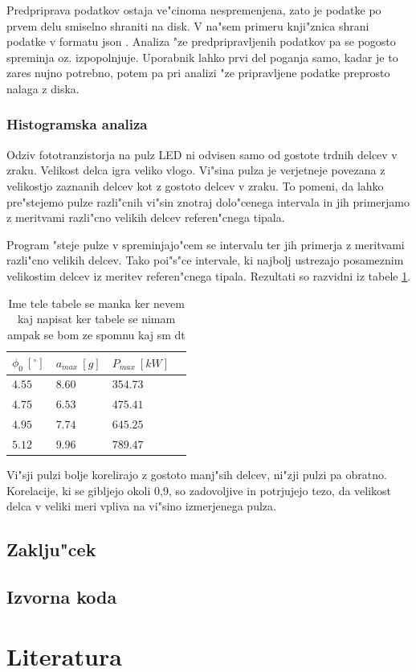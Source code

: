 \documentclass[11pt,a4paper]{article}
\begin{document}
Predpriprava podatkov ostaja ve"cinoma nespremenjena, zato je podatke po prvem delu smiselno shraniti na disk. V na"sem primeru knji"znica shrani podatke v formatu json \cite{json}. Analiza "ze predpripravljenih podatkov pa se pogosto spreminja oz. izpopolnjuje. Uporabnik lahko prvi del poganja samo, kadar je to zares nujno potrebno, potem pa pri analizi "ze pripravljene podatke preprosto nalaga z diska. 

\subsubsection{Histogramska analiza}
Odziv fototranzistorja na pulz LED ni odvisen samo od gostote trdnih delcev v zraku. Velikost delca igra veliko vlogo. Vi"sina pulza je verjetneje povezana z velikostjo zaznanih delcev kot z gostoto delcev v zraku. To pomeni, da lahko pre"stejemo pulze razli"cnih vi"sin znotraj dolo"cenega intervala in jih primerjamo z meritvami razli"cno velikih delcev referen"cnega tipala.

Program "steje pulze v spreminjajo"cem se intervalu ter jih primerja z meritvami razli"cno velikih delcev. Tako poi"s"ce intervale, ki najbolj ustrezajo posameznim velikostim delcev iz meritev referen"cnega tipala. Rezultati so razvidni iz tabele \ref{table:correlations}.


\begin{table}[H]
	\centering
	\begin{tabular}{l|lll}
		$ \phi_0\ [^\circ] $ & $a_{max}\ [g]$ & $ P_{max} \ [kW] $ \\
		\hline
		$ 4.55 $ & $ 8.60 $ & $ 354.73 $ \\
		$ 4.75 $ & $ 6.53 $ & $ 475.41 $ \\
		$ 4.95 $ & $ 7.74 $ & $ 645.25 $ \\
		$ 5.12 $ & $ 9.96 $ & $ 789.47 $
	\end{tabular}
	\caption{Ime tele tabele se manka ker nevem kaj napisat ker tabele se nimam ampak se bom ze spomnu kaj sm dt}
	\label{table:correlations}
	\def\arraystretch{1}
\end{table}

Vi"sji pulzi bolje korelirajo z gostoto manj"sih delcev, ni"zji pulzi pa obratno. Korelacije, ki se gibljejo okoli 0,9, so zadovoljive in potrjujejo tezo, da velikost delca v veliki meri vpliva na vi"sino izmerjenega pulza.

\clearpage
\subsection{Zaklju"cek}


\clearpage

\begin{appendices}
	\section{Izvorna koda}
\end{appendices}
\clearpage

\section{Literatura}
\printbibliography[heading=none]
\end{document}
